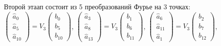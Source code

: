 \documentclass{mai_book}
\begin{document}
{\noindent Второй этаап состоит из 5 преобразований Фурье на 3 точках:\\

$\begin{pmatrix}
\hat{a}_0 \\ \hat{a}_5 \\ \hat{a}_{10} 
\end{pmatrix} = V_3 
\begin{pmatrix}
b_0 \\ b_5 \\ b_{10} 
\end{pmatrix}$, 
$\begin{pmatrix}
\hat{a}_3 \\ \hat{a}_8 \\ \hat{a}_{13} 
\end{pmatrix} = V_3
\begin{pmatrix}
b_1 \\ b_6 \\ b_{11} 
\end{pmatrix}$, 
$\begin{pmatrix}
\hat{a}_6 \\ \hat{a}_{11} \\ \hat{a}_1 
\end{pmatrix} = V_3 
\begin{pmatrix}
b_2 \\ b_7 \\ b_{12} 
\end{pmatrix}$, \\
\begin{center}


\end{center}}
\end{document}
